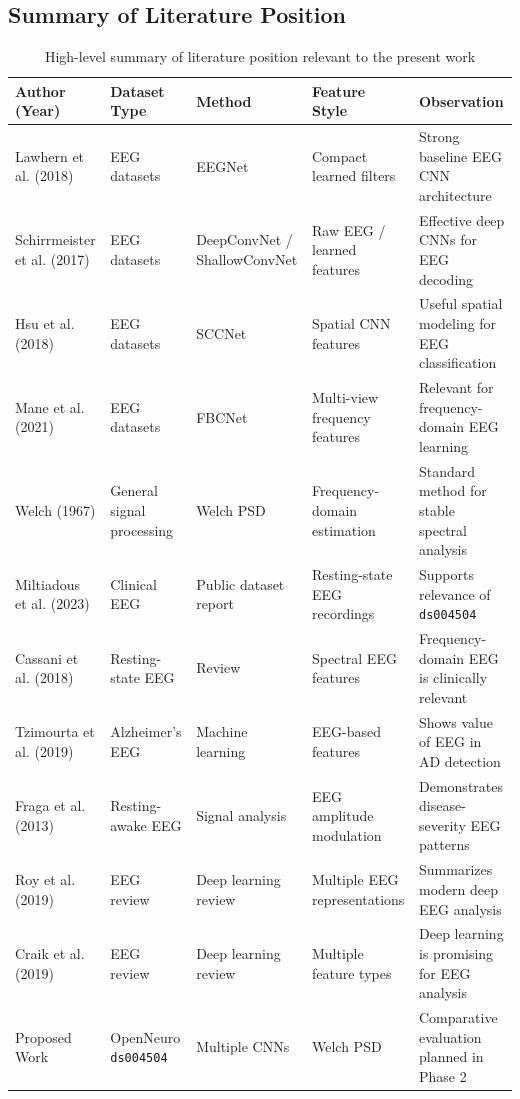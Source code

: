 \documentclass[12pt,a4paper]{article}
\begin{document}
\subsection{Summary of Literature Position}
\begin{table}[H]
\centering
\scriptsize
\setlength{\tabcolsep}{2pt}
\renewcommand{\arraystretch}{1.2}
\begin{tabular}{|p{2.4cm}|p{1.9cm}|p{2.1cm}|p{2.1cm}|p{2.9cm}|}
\hline
\textbf{Author (Year)} & \textbf{Dataset Type} & \textbf{Method} & \textbf{Feature Style} & \textbf{Observation} \\
\hline
Lawhern et al. (2018) & EEG datasets & EEGNet & Compact learned filters & Strong baseline EEG CNN architecture \\
\hline
Schirrmeister et al. (2017) & EEG datasets & DeepConvNet / ShallowConvNet & Raw EEG / learned features & Effective deep CNNs for EEG decoding \\
\hline
Hsu et al. (2018) & EEG datasets & SCCNet & Spatial CNN features & Useful spatial modeling for EEG classification \\
\hline
Mane et al. (2021) & EEG datasets & FBCNet & Multi-view frequency features & Relevant for frequency-domain EEG learning \\
\hline
Welch (1967) & General signal processing & Welch PSD & Frequency-domain estimation & Standard method for stable spectral analysis \\
\hline
Miltiadous et al. (2023) & Clinical EEG & Public dataset report & Resting-state EEG recordings & Supports relevance of \texttt{ds004504} \\
\hline
Cassani et al. (2018) & Resting-state EEG & Review & Spectral EEG features & Frequency-domain EEG is clinically relevant \\
\hline
Tzimourta et al. (2019) & Alzheimer's EEG & Machine learning & EEG-based features & Shows value of EEG in AD detection \\
\hline
Fraga et al. (2013) & Resting-awake EEG & Signal analysis & EEG amplitude modulation & Demonstrates disease-severity EEG patterns \\
\hline
Roy et al. (2019) & EEG review & Deep learning review & Multiple EEG representations & Summarizes modern deep EEG analysis \\
\hline
Craik et al. (2019) & EEG review & Deep learning review & Multiple feature types & Deep learning is promising for EEG analysis \\
\hline
Proposed Work & OpenNeuro \texttt{ds004504} & Multiple CNNs & Welch PSD & Comparative evaluation planned in Phase 2 \\
\hline
\end{tabular}
\caption{High-level summary of literature position relevant to the present work}
\end{table}
\end{document}
